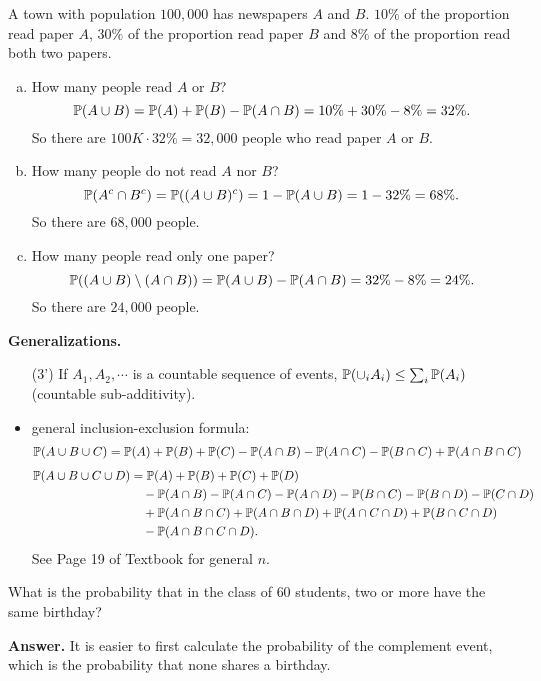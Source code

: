   \begin{example}
    A town with population $100,000$ has newspapers $A$ and $B$. $10\%$ of the
    proportion read paper $A$, $30\%$ of the
    proportion read paper $B$ and $8\%$ of the
    proportion read both two papers. 
  \end{example}
  \begin{enumerate}[(a)]
  \item How many people read $A$ or $B$?
    \[
      \mathbb{P}(A\cup B) = \mathbb{P}(A) + \mathbb{P}(B) - \mathbb{P}(A\cap B) = 10\% + 30\% - 8\% = 32\%.
    \]
    So there are $100 K\cdot 32\% = 32,000$ people who read paper $A$ or $B$.
  \item How many people do not read $A$ nor $B$?
    \[
      \mathbb{P}(A^c\cap B^c) = \mathbb{P}((A\cup B)^c) = 1 - \mathbb{P}(A\cup B) = 1-32\% = 68\%.
    \]
    So there are $68,000$ people.
  \item How many people read only one paper?
    \[
      \mathbb{P}((A\cup B)\setminus (A\cap B)) = \mathbb{P}(A\cup B) - \mathbb{P}(A\cap B) = 32\% -8\% = 24\%.
    \]
    So there are $24,000$ people.
  \end{enumerate}
  \textbf{Generalizations.}
  \begin{itemize}
  \item [(3')] If $A_1,A_2,\cdots$ is a countable sequence of events,
    $\mathbb{P}(\cup_i A_i) \le \sum_i \mathbb{P}(A_i)$ (countable sub-additivity).
  \item general inclusion-exclusion formula:
    \begin{align*}
      \mathbb{P}(A\cup B\cup C)
      & = \mathbb{P}(A) + \mathbb{P}(B) + \mathbb{P}(C) - \mathbb{P}(A\cap B) - \mathbb{P}(A\cap C) -\mathbb{P}(B\cap C) + \mathbb{P}(A\cap B\cap C)
    \end{align*}
    \begin{align*}
      \mathbb{P}(A\cup B\cup C\cup D)
      & = \mathbb{P}(A) + \mathbb{P}(B) + \mathbb{P}(C) + \mathbb{P}(D)\\
      & \quad - \mathbb{P}(A\cap B) - \mathbb{P}(A\cap C) - \mathbb{P}(A\cap D) - \mathbb{P}(B\cap C) -\mathbb{P}(B\cap D) - \mathbb{P}(C\cap D)\\
      & \quad + \mathbb{P}(A\cap B\cap C) + \mathbb{P}(A\cap B\cap D) + \mathbb{P}(A\cap C\cap D) + \mathbb{P}(B\cap C\cap D)\\
      & \quad - \mathbb{P}(A\cap B\cap C\cap D).
    \end{align*}
    See Page 19 of Textbook for general $n$.
  \end{itemize}
  \begin{example}
    What is the probability that in the class of $60$ students, two or more have
    the same birthday?
  \end{example}
  \textbf{Answer.} It is easier to first calculate the probability of the
  complement event, which is the probability that none shares a birthday.

